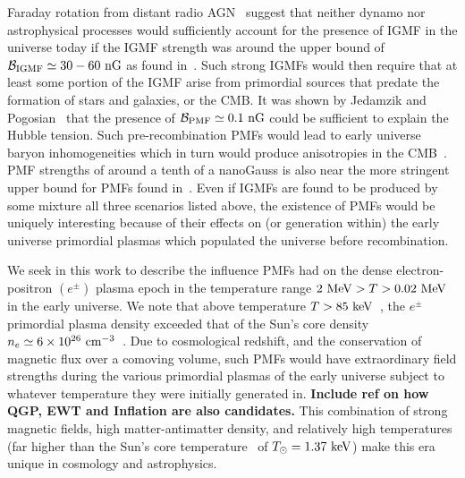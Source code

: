 \documentclass[a4paper]{article}
\begin{document}
Faraday rotation from distant radio AGN~\cite{pomakov2022redshift} suggest that neither dynamo nor astrophysical processes would sufficiently account for the presence of IGMF in the universe today if the IGMF strength was around the upper bound of ${\cal B}_{\rm IGMF}\simeq30-60{\rm\ nG}$ as found in~\cite{vernstrom2021discovery}. Such strong IGMFs would then require that at least some portion of the IGMF arise from primordial sources that predate the formation of stars and galaxies, or the CMB. It was shown by Jedamzik and Pogosian~\cite{jedamzik2020relieving} that the presence of ${\cal B}_{\rm PMF}\simeq0.1{\rm\ nG}$ could be sufficient to explain the Hubble tension. Such pre-recombination PMFs would lead to early universe baryon inhomogeneities which in turn would produce anisotropies in the CMB~\cite{jedamzik2013smallscale}. PMF strengths of around a tenth of a nanoGauss is also near the more stringent upper bound for PMFs found in~\cite{pshirkov2015new,jedamzik2019stringent}. Even if IGMFs are found to be produced by some mixture all three scenarios listed above, the existence of PMFs would be uniquely interesting because of their effects on (or generation within) the early universe primordial plasmas which populated the universe before recombination.

We seek in this work to describe the influence PMFs had on the dense electron-positron $(e^{\pm})$ plasma epoch in the temperature range $2\text{ MeV}>T>0.02\text{ MeV}$ in the early universe. We note that above temperature $T>85\text{ keV}$~\cite{rafelski2023short}, the $e^{\pm}$ primordial plasma density exceeded that of the Sun's core density $n_{e}\simeq6\times10^{26}{\rm\ cm}^{-3}$~\cite{bahcall2001solar}. Due to cosmological redshift, and the conservation of magnetic flux over a comoving volume, such PMFs would have extraordinary field strengths during the various primordial plasmas of the early universe subject to whatever temperature they were initially generated in. \textbf{Include ref on how QGP, EWT and Inflation are also candidates.} This combination of strong magnetic fields, high matter-antimatter density, and relatively high temperatures (far higher than the Sun's core temperature~\cite{castellani1997solar} of $T_{\odot}=1.37\text{ keV}$) make this era unique in cosmology and astrophysics.

\end{document}
